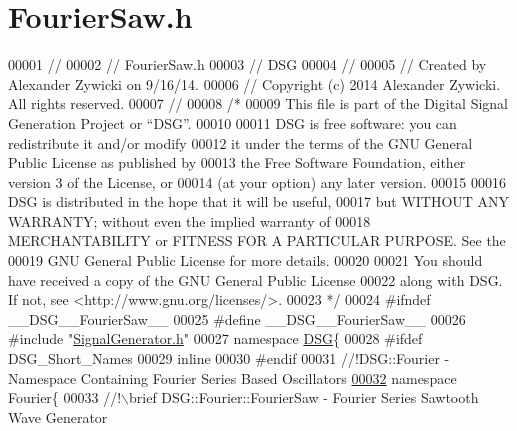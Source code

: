 \hypertarget{_fourier_saw_8h_source}{\section{Fourier\+Saw.\+h}
\label{_fourier_saw_8h_source}
}

\begin{DoxyCode}
00001 \textcolor{comment}{//}
00002 \textcolor{comment}{//  FourierSaw.h}
00003 \textcolor{comment}{//  DSG}
00004 \textcolor{comment}{//}
00005 \textcolor{comment}{//  Created by Alexander Zywicki on 9/16/14.}
00006 \textcolor{comment}{//  Copyright (c) 2014 Alexander Zywicki. All rights reserved.}
00007 \textcolor{comment}{//}
00008 \textcolor{comment}{/*}
00009 \textcolor{comment}{ This file is part of the Digital Signal Generation Project or “DSG”.}
00010 \textcolor{comment}{}
00011 \textcolor{comment}{ DSG is free software: you can redistribute it and/or modify}
00012 \textcolor{comment}{ it under the terms of the GNU General Public License as published by}
00013 \textcolor{comment}{ the Free Software Foundation, either version 3 of the License, or}
00014 \textcolor{comment}{ (at your option) any later version.}
00015 \textcolor{comment}{}
00016 \textcolor{comment}{ DSG is distributed in the hope that it will be useful,}
00017 \textcolor{comment}{ but WITHOUT ANY WARRANTY; without even the implied warranty of}
00018 \textcolor{comment}{ MERCHANTABILITY or FITNESS FOR A PARTICULAR PURPOSE.  See the}
00019 \textcolor{comment}{ GNU General Public License for more details.}
00020 \textcolor{comment}{}
00021 \textcolor{comment}{ You should have received a copy of the GNU General Public License}
00022 \textcolor{comment}{ along with DSG.  If not, see <http://www.gnu.org/licenses/>.}
00023 \textcolor{comment}{ */}
00024 \textcolor{preprocessor}{#ifndef \_\_DSG\_\_FourierSaw\_\_}
00025 \textcolor{preprocessor}{#define \_\_DSG\_\_FourierSaw\_\_}
00026 \textcolor{preprocessor}{#include "\hyperlink{_signal_generator_8h}{SignalGenerator.h}"}
00027 \textcolor{keyword}{namespace }\hyperlink{namespace_d_s_g}{DSG}\{
00028 \textcolor{preprocessor}{#ifdef DSG\_Short\_Names}
00029     \textcolor{keyword}{inline}
00030 \textcolor{preprocessor}{#endif}
00031 \textcolor{comment}{    //!DSG::Fourier - Namespace Containing Fourier Series Based Oscillators}
\hypertarget{_fourier_saw_8h_source_l00032}{}\hyperlink{namespace_d_s_g_1_1_fourier}{00032} \textcolor{comment}{}    \textcolor{keyword}{namespace }Fourier\{\textcolor{comment}{}
00033 \textcolor{comment}{        //!\(\backslash\)brief DSG::Fourier::FourierSaw - Fourier Series Sawtooth Wave Generator}

\end{DoxyCode}
